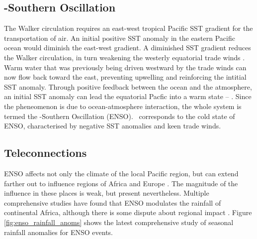 \subsection{\elnino-Southern Oscillation}
The Walker circulation requires an east-west tropical Pacific SST gradient for
the transportation of air. An initial positive SST anomaly in the eastern
Pacific ocean would diminish the east-west gradient. A diminished SST gradient
reduces the Walker circulation, in turn weakening the westerly equatorial trade
winds \citep{lindzen1987}. Warm water that was previously being driven westward
by the trade winds can now flow back toward the east, preventing upwelling and
reinforcing the intitial SST anomaly. Through positive feedback between the
ocean and the atmosphere, an initial SST anomaly can lead the equatorial Pacfic
into a warm state -- \elnino. Since the pheneomenon is due to ocean-atmosphere
interaction, the whole system is termed the \elnino-Southern Oscillation
(ENSO). {}\nina\ corresponds to the cold state of ENSO, characterised by
negative SST anomalies and keen trade winds.


\subsection{Teleconnections}
ENSO affects not only the climate of the local Pacific region, but can extend
farther out to influence regions of Africa and Europe \citep{moron1998}. The
magnitude of the influence in these places is weak, but present
nevertheless. Multiple comprehensive studies \citep{ropelewski1987,
  ropelewski1989, nicholson1996} have found that ENSO modulates the rainfall of
continental Africa, although there is some dispute about regional impact
\citep{wolter1989}. Figure \ref{fig:enso_rainfall_anoms} shows the latest
comprehensive study of seasonal rainfall anomalies for ENSO events.

